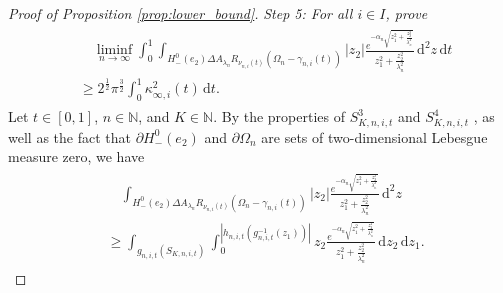 \documentclass[11pt]{article}
\numberwithin{statement}{section}
\numberwithin{equation}{section}
\theoremstyle{remark}
\newcommand{\N}{\mathbb N}
\newcommand{\intd}{\, \mathrm{d}} 				%
\begin{document}
\begin{proof}[Proof of Proposition \ref{prop:lower_bound}]
\textit{Step 5: For all $i \in I$, prove
	\begin{align}\label{eq:lower_bound_one_curve}
	  \begin{split}
            & \quad \liminf_{n \to \infty} \int_0^1 \int_{ H^0_-(e_2)
              \Delta A_{\lambda_n} R_{\nu_{n,i}(t)} (\Omega_n -
              \gamma_{n,i}(t)) } \left| z_2 \right|
            \frac{e^{-\alpha_n\sqrt{z_1^2 + \frac{z_2^2}{\lambda_n^2}
                }}}{z_1^2 + \frac{z_2^2}{\lambda_n^2}} \intd^2 z \intd t\\
            & \geq 2^\frac{1}{2} \pi^\frac{3}{2} \int_0^1
            \kappa^2_{\infty,i}(t) \intd t.
	  \end{split}
	\end{align}}
      Let $t\in [0,1]$, $n\in \N$, and $K \in \N$.
      By the properties of
      $S^3_{K,n,i,t}$ and $S^4_{K,n,i,t}$ , as well as the fact that
      $\partial H_-^0(e_2)$ and $\partial \Omega_n$ are sets of
      two-dimensional
      Lebesgue measure zero, we have  
	\begin{align}\label{eq:exploit_graph}
	  \begin{split}
            & \quad \int_{ H^0_-(e_2) \Delta A_{\lambda_n}
              R_{\nu_{n,i}(t)} (\Omega_n - \gamma_{n,i}(t)) }
            \left| z_2 \right| \frac{e^{-\alpha_n\sqrt{z_1^2 +
                  \frac{z_2^2}{\lambda_n^2} }}}{z_1^2 +
              \frac{z_2^2}{\lambda_n^2}} \intd^2 z \\
            & \geq \int_{g_{n,i,t}\left( S_{K,n,i,t}\right)}
            \int_0^{|h_{n,i,t}(g_{n,i,t}^{-1}(z_1))|} z_2
            \frac{e^{-\alpha_n\sqrt{z_1^2 + \frac{z_2^2}{\lambda_n^2}
                }}}{z_1^2 + \frac{z_2^2}{\lambda_n^2}} \intd z_2 \intd
            z_1.
	  \end{split}
	 \end{align}
	 

\end{proof}
\end{document}
